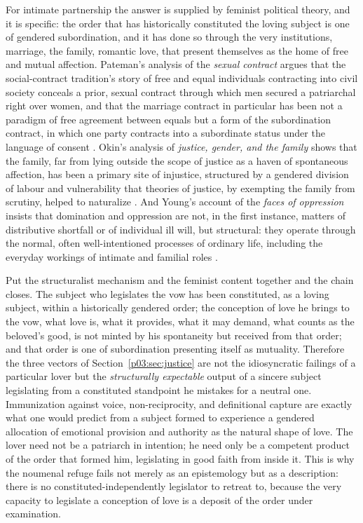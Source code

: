 For intimate partnership the answer is supplied by feminist political theory, and it is specific: the order that has historically constituted the loving subject is one of gendered subordination, and it has done so through the very institutions, marriage, the family, romantic love, that present themselves as the home of free and mutual affection. Pateman's analysis of the \emph{sexual contract} argues that the social-contract tradition's story of free and equal individuals contracting into civil society conceals a prior, sexual contract through which men secured a patriarchal right over women, and that the marriage contract in particular has been not a paradigm of free agreement between equals but a form of the subordination contract, in which one party contracts into a subordinate status under the language of consent \parencite{pateman1988sexual}. Okin's analysis of \emph{justice, gender, and the family} shows that the family, far from lying outside the scope of justice as a haven of spontaneous affection, has been a primary site of injustice, structured by a gendered division of labour and vulnerability that theories of justice, by exempting the family from scrutiny, helped to naturalize \parencite{okin1989justice}. And Young's account of the \emph{faces of oppression} insists that domination and oppression are not, in the first instance, matters of distributive shortfall or of individual ill will, but structural: they operate through the normal, often well-intentioned processes of ordinary life, including the everyday workings of intimate and familial roles \parencite{young1990justice}.

Put the structuralist mechanism and the feminist content together and the chain closes. The subject who legislates the vow has been constituted, as a loving subject, within a historically gendered order; the conception of love he brings to the vow, what love is, what it provides, what it may demand, what counts as the beloved's good, is not minted by his spontaneity but received from that order; and that order is one of subordination presenting itself as mutuality. Therefore the three vectors of Section~\ref{p03:sec:justice} are not the idiosyncratic failings of a particular lover but the \emph{structurally expectable} output of a sincere subject legislating from a constituted standpoint he mistakes for a neutral one. Immunization against voice, non-reciprocity, and definitional capture are exactly what one would predict from a subject formed to experience a gendered allocation of emotional provision and authority as the natural shape of love. The lover need not be a patriarch in intention; he need only be a competent product of the order that formed him, legislating in good faith from inside it. This is why the noumenal refuge fails not merely as an epistemology but as a description: there is no constituted-independently legislator to retreat to, because the very capacity to legislate a conception of love is a deposit of the order under examination.

